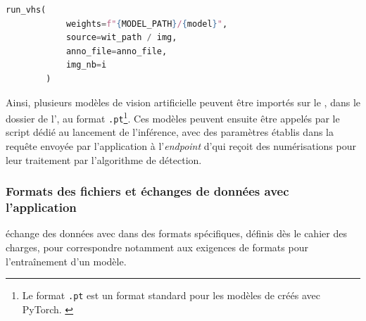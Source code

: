	\begin{lstlisting}[language=Python]
		run_vhs(
			weights=f"{MODEL_PATH}/{model}",
			source=wit_path / img,
			anno_file=anno_file,
			img_nb=i
		)\end{lstlisting}
	
	Ainsi, plusieurs modèles de vision artificielle peuvent être importés sur le \gpu, dans le dossier de l'\api, au format \texttt{.pt}\footnote{Le format \texttt{.pt} est un format standard pour les modèles de \ml créés avec PyTorch. \cite{dowlingGuideFileFormats2019}}. Ces modèles peuvent ensuite être appelés par le script dédié au lancement de l'inférence, avec des paramètres établis dans la requête envoyée par l'application \eida à l'\textit{endpoint} d'\exapi qui reçoit des numérisations pour leur traitement par l'algorithme de détection.

	\subsubsection{Formats des fichiers et échanges de données avec l'application}
	\exapi échange des données avec \eida dans des formats spécifiques, définis dès le cahier des charges, pour correspondre notamment aux exigences de formats pour l'entraînement d'un modèle. 
	

